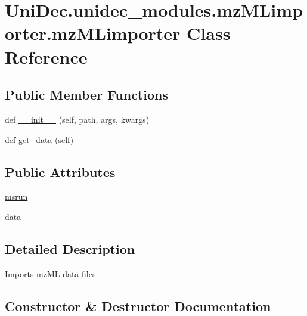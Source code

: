 \hypertarget{class_uni_dec_1_1unidec__modules_1_1mz_m_limporter_1_1mz_m_limporter}{}\section{Uni\+Dec.\+unidec\+\_\+modules.\+mz\+M\+Limporter.\+mz\+M\+Limporter Class Reference}
\label{class_uni_dec_1_1unidec__modules_1_1mz_m_limporter_1_1mz_m_limporter}
\subsection*{Public Member Functions}
\begin{DoxyCompactItemize}
\item 
def \hyperlink{class_uni_dec_1_1unidec__modules_1_1mz_m_limporter_1_1mz_m_limporter_a0ca891290b46edbb2c1fbfc9c436f1eb}{\+\_\+\+\_\+init\+\_\+\+\_\+} (self, path, args, kwargs)
\item 
def \hyperlink{class_uni_dec_1_1unidec__modules_1_1mz_m_limporter_1_1mz_m_limporter_a17097a5a09b98a832f5e3eaea230d2d3}{get\+\_\+data} (self)
\end{DoxyCompactItemize}
\subsection*{Public Attributes}
\begin{DoxyCompactItemize}
\item 
\hyperlink{class_uni_dec_1_1unidec__modules_1_1mz_m_limporter_1_1mz_m_limporter_ade9fc5a572dae0b438c7e27000391950}{msrun}
\item 
\hyperlink{class_uni_dec_1_1unidec__modules_1_1mz_m_limporter_1_1mz_m_limporter_a54420688600df621e32b81d9e3aa3a77}{data}
\end{DoxyCompactItemize}


\subsection{Detailed Description}
\begin{DoxyVerb}Imports mzML data files.
\end{DoxyVerb}
 

\subsection{Constructor \& Destructor Documentation}
\hypertarget{class_uni_dec_1_1unidec__modules_1_1mz_m_limporter_1_1mz_m_limporter_a0ca891290b46edbb2c1fbfc9c436f1eb}{}
